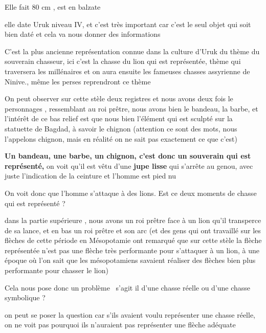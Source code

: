 \documentclass[a4paper]{article}
\begin{document}
{
Elle fait 80 cm , est en balzate}

{
elle date Uruk niveau IV, et c'est très important car c'est le seul
objet qui soit bien daté et cela va nous donner des informations}


\bigskip

{
C'est la plus ancienne représentation connue dans la culture d'Uruk du
thème du souverain chasseur, ici c'est la chasse du lion qui est
représentée, thème qui traversera les millénaires et on aura ensuite
les fameuses chasses assyrienne de Ninive., même les perses reprendront
ce thème }


\bigskip


\bigskip

{
On peut observer sur cette stèle deux registres et nous avons deux fois
le personnages , ressemblant au roi prêtre, nous avons bien le bandeau,
la barbe, et l'intérêt de ce bas relief est que nous bien l'élément qui
est sculpté sur la statuette de Bagdad, à savoir le chignon (attention
ce sont des mots, nous l'appelons chignon, mais en réalité on ne sait
pas exactement ce que c'est)}

{
\textbf{Un bandeau, une barbe, un chignon, c'est donc un souverain qui
est représenté,} on voit qu'il est vêtu d'une \textbf{jupe lisse} qui
s'arrête au genou, avec juste l'indication de la ceinture et l'homme
est pied nu}


\bigskip

{
On voit donc que l'homme s'attaque à des lions. Est ce deux moments de
chasse qui est représenté ? }

{
dans la partie supérieure , nous avons un roi prêtre face à un lion
qu'il transperce de sa lance, et en bas un roi prêtre et son arc (et
des gens qui ont travaillé sur les flèches de cette période en
Mésopotamie ont remarqué que sur cette stèle la flèche représentée
n'est pas une flèche très performante pour s'attaquer à un lion, à une
époque où l'on sait que les mésopotamiens savaient réaliser des flèches
bien plus performante pour chasser le lion)}


\bigskip

{
Cela nous pose donc un problème \ s'agit il d'une chasse réelle ou d'une
chasse symbolique ?}

{
on peut se poser la question car s'ils avaient voulu représenter une
chasse réelle, on ne voit pas pourquoi ils n'auraient pas représenter
une flèche adéquate}
\end{document}
